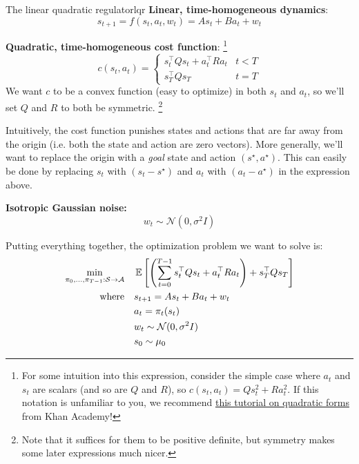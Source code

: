 \documentclass[../main/main]{subfiles}
\begin{document}
\begin{definition}{The linear quadratic regulator}{lqr}
    \textbf{Linear, time-homogeneous dynamics}: \[
        s_{t+1} = f(s_t, a_t, w_t) = A s_t + B a_t + w_t
    \]

    \noindent \textbf{Quadratic, time-homogeneous cost function}:
    \footnote{For some intuition into this expression, consider the simple case where $a_t$ and $s_t$ are scalars (and so are $Q$ and $R$), so $c(s_t, a_t) = Q s_t^2 + R a_t^2$. If this notation is unfamiliar to you, we recommend \href{https://www.khanacademy.org/math/multivariable-calculus/applications-of-multivariable-derivatives/quadratic-approximations/v/expressing-a-quadratic-form-with-a-matrix}{this tutorial on quadratic forms} from Khan Academy!}
    \[
        c(s_t, a_t) = \begin{cases}
            s_t^\top Q s_t + a_t^\top R a_t & t < T \\
            s_T^\top Q s_T & t = T
        \end{cases}
    \]
    We want $c$ to be a convex function (easy to optimize) in both $s_t$ and $a_t$, so we'll set $Q$ and $R$ to both be symmetric. \footnote{Note that it suffices for them to be positive definite, but symmetry makes some later expressions much nicer.}

    Intuitively, the cost function punishes states and actions that are far away from the origin (i.e. both the state and action are zero vectors). More generally, we'll want to replace the origin with a \emph{goal} state and action $(s^\star, a^\star).$ This can easily be done by replacing $s_t$ with $(s_t - s^\star)$ and $a_t$ with $(a_t - a^\star)$ in the expression above.
    

    \noindent \textbf{Isotropic Gaussian noise:} \[ w_t \sim \mathcal{N}(0, \sigma^2 I) \]

    \noindent Putting everything together, the optimization problem we want to solve is:
    \begin{align*}
        \min_{\pi_0, \dots, \pi_{T-1} : \mathcal{S} \to \mathcal{A}} \quad & \operatorname*{\mathbb{E}} \left[ \left( \sum_{t=0}^{T-1} s_t^\top Q s_t + a_t^\top R a_t \right) + s_T^\top Q s_T \right] \\
        \textrm{where} \quad & s_{t+1} = A s_t + B a_t + w_t \\
        & a_t = \pi_t (s_t) \\
        & w_t \sim \mathcal{N}(0, \sigma^2 I) \\
        & s_0 \sim \mu_0
    \end{align*}
\end{definition}
\end{document}
